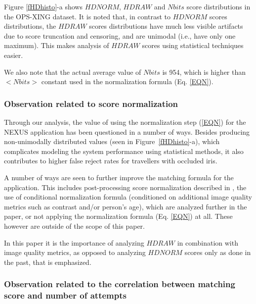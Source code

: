 \documentclass{cta-author}%
\begin{document}
Figure \ref{fHDhisto}-a  shows  $HDNORM$, $HDRAW$ and $Nbits$ score distributions in the OPS-XING dataset.
It is noted that, in contrast to   $HDNORM$ scores distributions, the $HDRAW$ scores distributions 
have much less visible artifacts
due to score truncation and censoring, and are unimodal (i.e., have only one maximum). This makes analysis of  $HDRAW$ scores using statistical techniques easier.

We also note that the actual average value of $Nbits$ is 954, which is higher than $<Nbits>$ constant used in the normalization formula (Eq. \ref{EQN}).


\subsubsection{Observation related to score normalization }
\label{s.score.normalization}

Through our analysis, the value of using the normalization step (\ref{EQN}) for the NEXUS application has been questioned in a number of ways. Besides producing non-unimodally distributed values (seen in Figure~\ref{fHDhisto}-a), which complicates modeling the system performance using statistical methods, it also contributes to higher false reject rates for travellers with  occluded iris.

A number of ways are seen to further improve the matching formula for the application. This includes post-processing score normalization described in \cite{GorodnichyScore},  the use of conditional normalization formula (conditioned on additional image quality metrics such as contrast and/or person's age), which are analyzed further in the paper, or not applying the normalization formula (Eq. \ref{EQN}) at all. These however are outside of the scope of this paper. 

In this paper  it is the importance of analyzing $HDRAW$ in combination with image quality metrics, as opposed to analyzing  $HDNORM$ scores only as done in the past, that is emphasized. 


\subsubsection{Observation related to the correlation between matching score and number of attempts }
\label{s.HDvsAttm}
\end{document}
